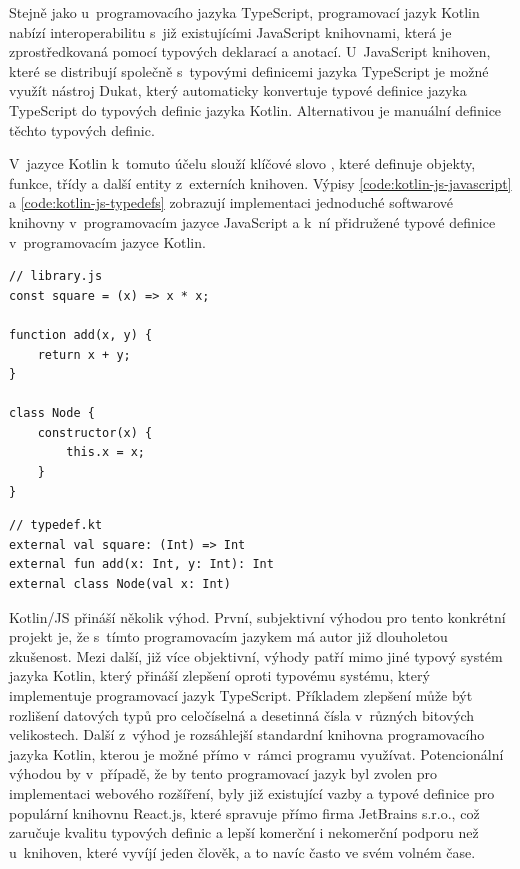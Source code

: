 Stejně jako u~programovacího jazyka TypeScript, programovací jazyk Kotlin nabízí interoperabilitu s~již existujícími JavaScript knihovnami, která je zprostředkovaná pomocí typových deklarací a anotací. 
U~JavaScript knihoven, které se distribují společně s~typovými definicemi jazyka TypeScript je možné využít nástroj Dukat, který automaticky konvertuje typové definice jazyka TypeScript do typových definic jazyka Kotlin. Alternativou je manuální definice těchto typových definic.

V~jazyce Kotlin k~tomuto účelu slouží klíčové slovo , které definuje objekty, funkce, třídy a další entity z~externích knihoven. Výpisy \ref{code:kotlin-js-javascript} a \ref{code:kotlin-js-typedefs} zobrazují implementaci jednoduché softwarové knihovny v~programovacím jazyce JavaScript a k~ní přidružené typové definice v~programovacím jazyce Kotlin.

\begin{lstlisting}[label={code:kotlin-js-javascript}, caption={Jednoduchá JavaScript knihovna pro demonstraci typových definic v~jazyce Kotlin (vlastní zpracování)}]
// library.js
const square = (x) => x * x;

function add(x, y) {
    return x + y;
}

class Node {
    constructor(x) {
        this.x = x; 
    }
}
\end{lstlisting}

\begin{lstlisting}[label={code:kotlin-js-typedefs}, caption={Typové definice v~jazyce Kotlin pro externí JavaScript knihovnu (vlastní zpracování)}]
// typedef.kt
external val square: (Int) => Int
external fun add(x: Int, y: Int): Int
external class Node(val x: Int)
\end{lstlisting}

Kotlin/JS přináší několik výhod. První, subjektivní výhodou pro tento konkrétní projekt je, že s~tímto programovacím jazykem má autor již dlouholetou zkušenost. Mezi další, již více objektivní, výhody patří mimo jiné typový systém jazyka Kotlin, který přináší zlepšení oproti typovému systému, který implementuje programovací jazyk TypeScript. Příkladem zlepšení může být rozlišení datových typů pro celočíselná a desetinná čísla v~různých bitových velikostech. Další z~výhod je rozsáhlejší standardní knihovna programovacího jazyka Kotlin, kterou je možné přímo v~rámci programu využívat. Potencionální výhodou by v~případě, že by tento programovací jazyk byl zvolen pro implementaci webového rozšíření, byly již existující vazby a typové definice pro populární knihovnu React.js, které spravuje přímo firma JetBrains s.r.o., což zaručuje kvalitu typových definic a lepší komerční i nekomerční podporu než u~knihoven, které vyvíjí jeden člověk,  a to navíc často ve svém volném čase.

